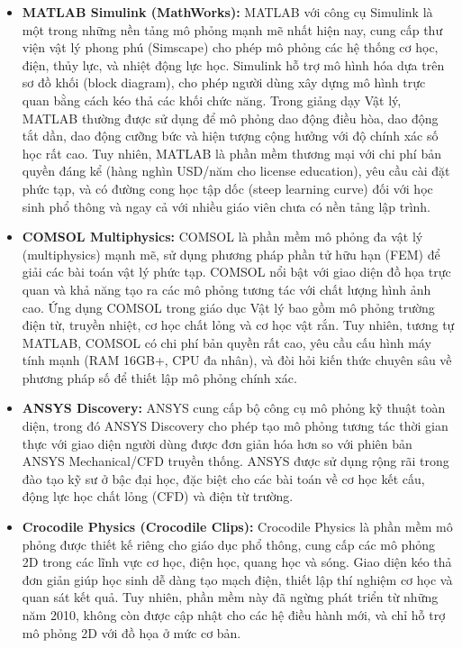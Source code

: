 \begin{itemize}
    \item \textbf{MATLAB Simulink (MathWorks):} MATLAB với công cụ Simulink là một trong những nền tảng mô phỏng mạnh mẽ nhất hiện nay, cung cấp thư viện vật lý phong phú (Simscape) cho phép mô phỏng các hệ thống cơ học, điện, thủy lực, và nhiệt động lực học. Simulink hỗ trợ mô hình hóa dựa trên sơ đồ khối (block diagram), cho phép người dùng xây dựng mô hình trực quan bằng cách kéo thả các khối chức năng. Trong giảng dạy Vật lý, MATLAB thường được sử dụng để mô phỏng dao động điều hòa, dao động tắt dần, dao động cưỡng bức và hiện tượng cộng hưởng với độ chính xác số học rất cao. Tuy nhiên, MATLAB là phần mềm thương mại với chi phí bản quyền đáng kể (hàng nghìn USD/năm cho license education), yêu cầu cài đặt phức tạp, và có đường cong học tập dốc (steep learning curve) đối với học sinh phổ thông và ngay cả với nhiều giáo viên chưa có nền tảng lập trình.
    
    \item \textbf{COMSOL Multiphysics:} COMSOL là phần mềm mô phỏng đa vật lý (multiphysics) mạnh mẽ, sử dụng phương pháp phần tử hữu hạn (FEM) để giải các bài toán vật lý phức tạp. COMSOL nổi bật với giao diện đồ họa trực quan và khả năng tạo ra các mô phỏng tương tác với chất lượng hình ảnh cao. Ứng dụng COMSOL trong giáo dục Vật lý bao gồm mô phỏng trường điện từ, truyền nhiệt, cơ học chất lỏng và cơ học vật rắn. Tuy nhiên, tương tự MATLAB, COMSOL có chi phí bản quyền rất cao, yêu cầu cấu hình máy tính mạnh (RAM 16GB+, CPU đa nhân), và đòi hỏi kiến thức chuyên sâu về phương pháp số để thiết lập mô phỏng chính xác.
    
    \item \textbf{ANSYS Discovery:} ANSYS cung cấp bộ công cụ mô phỏng kỹ thuật toàn diện, trong đó ANSYS Discovery cho phép tạo mô phỏng tương tác thời gian thực với giao diện người dùng được đơn giản hóa hơn so với phiên bản ANSYS Mechanical/CFD truyền thống. ANSYS được sử dụng rộng rãi trong đào tạo kỹ sư ở bậc đại học, đặc biệt cho các bài toán về cơ học kết cấu, động lực học chất lỏng (CFD) và điện từ trường.
    
    \item \textbf{Crocodile Physics (Crocodile Clips):} Crocodile Physics là phần mềm mô phỏng được thiết kế riêng cho giáo dục phổ thông, cung cấp các mô phỏng 2D trong các lĩnh vực cơ học, điện học, quang học và sóng. Giao diện kéo thả đơn giản giúp học sinh dễ dàng tạo mạch điện, thiết lập thí nghiệm cơ học và quan sát kết quả. Tuy nhiên, phần mềm này đã ngừng phát triển từ những năm 2010, không còn được cập nhật cho các hệ điều hành mới, và chỉ hỗ trợ mô phỏng 2D với đồ họa ở mức cơ bản.
\end{itemize}


